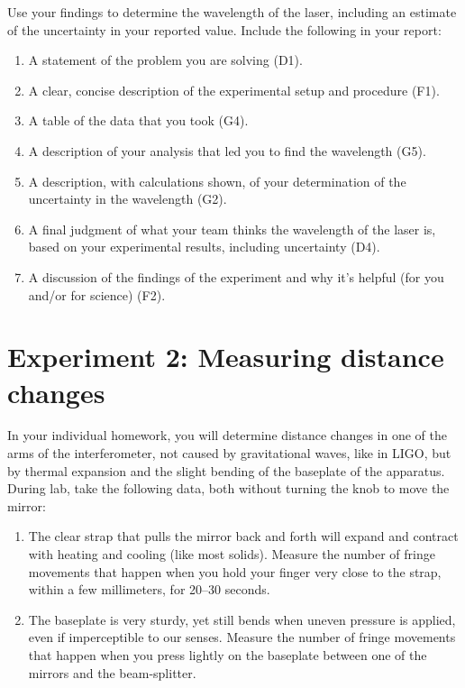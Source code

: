 Use your findings to determine the wavelength of the laser, including an estimate of the uncertainty in your reported value. Include the following in your report:
\begin{enumerate}
	\item A statement of the problem you are solving (D1).
	
	\item A clear, concise description of the experimental setup and procedure (F1).
	
	\item A table of the data that you took (G4).
	
	\item A description of your analysis that led you to find the wavelength (G5).
	
	\item A description, with calculations shown, of your determination of the uncertainty in the wavelength (G2).
	
	\item A final judgment of what your team thinks the wavelength of the laser is, based on your experimental results, including uncertainty (D4).
	
	\item A discussion of the findings of the experiment and why it's helpful (for you and/or for science) (F2).
\end{enumerate}

\section{Experiment 2: Measuring distance changes}

In your individual homework, you will determine distance changes in one of the arms of the interferometer, not caused by gravitational waves, like in LIGO, but by thermal expansion and the slight bending of the baseplate of the apparatus. During lab, take the following data, both without turning the knob to move the mirror:

\begin{enumerate}
	\item The clear strap that pulls the mirror back and forth will expand and contract with heating and cooling (like most solids). Measure the number of fringe movements that happen when you hold your finger very close to the strap, within a few millimeters, for 20--30 seconds.
	
	\item The baseplate is very sturdy, yet still bends when uneven pressure is applied, even if imperceptible to our senses. Measure the number of fringe movements that happen when you press lightly on the baseplate between one of the mirrors and the beam-splitter.
\end{enumerate}

